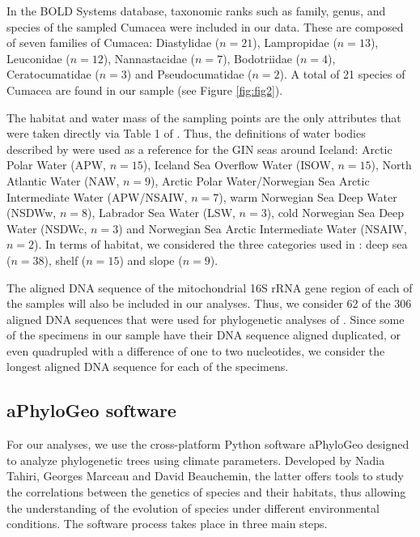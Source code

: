 In the BOLD Systems database, taxonomic ranks such as family, genus, and species of the sampled Cumacea were included in our data. These are composed of seven families of Cumacea: Diastylidae (\( n=21 \)), Lampropidae (\( n=13 \)), Leuconidae (\( n=12 \)), Nannastacidae (\( n=7 \)), Bodotriidae (\( n=4 \)), Ceratocumatidae (\( n=3 \)) and Pseudocumatidae (\( n=2 \)). A total of 21 species of Cumacea are found in our sample (see Figure \ref{fig:fig2}).

The habitat and water mass of the sampling points are the only attributes that were taken directly via Table 1 of \cite{uhlir_adding_2021}. Thus, the definitions of water bodies described by \cite{ostmann_marine_2014} were used as a reference for the GIN seas around Iceland: Arctic Polar Water (APW, \( n=15 \)), Iceland Sea Overflow Water (ISOW, \( n=15 \)), North Atlantic Water (NAW, \( n=9 \)), Arctic Polar Water/Norwegian Sea Arctic Intermediate Water (APW/NSAIW, \( n=7 \)), warm Norwegian Sea Deep Water (NSDWw, \( n=8 \)), Labrador Sea Water (LSW, \( n=3 \)), cold Norwegian Sea Deep Water (NSDWc, \( n=3 \)) and Norwegian Sea Arctic Intermediate Water (NSAIW, \( n=2 \)). In terms of habitat, we considered the three categories used in \cite{uhlir_adding_2021}: deep sea (\( n=38 \)), shelf (\( n=15 \)) and slope (\( n=9 \)).

The aligned DNA sequence of the mitochondrial 16S rRNA gene region of each of the samples will also be included in our analyses. Thus, we consider 62 of the 306 aligned DNA sequences that were used for phylogenetic analyses of \cite{uhlir_adding_2021}. Since some of the specimens in our sample have their DNA sequence aligned duplicated, or even quadrupled with a difference of one to two nucleotides, we consider the longest aligned DNA sequence for each of the specimens.

\subsection{aPhyloGeo software}

For our analyses, we use the cross-platform Python software aPhyloGeo designed to analyze phylogenetic trees using climate parameters. Developed by Nadia Tahiri, Georges Marceau and David Beauchemin, the latter offers tools to study the correlations between the genetics of species and their habitats, thus allowing the understanding of the evolution of species under different environmental conditions. The software process takes place in three main steps. 

